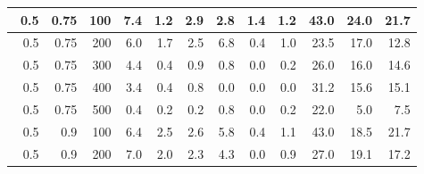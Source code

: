 \begin{longtable}{|r|r|r|r|r|r|r|r|r|r|r|r|}
    \hline \
    0.5                            & 0.75                    & 100                       & 7.4                       & 1.2                       & 2.9                       & 2.8                       & 1.4                       & 1.2                       & 43.0                      & 24.0                      & 21.7                      \\
    \hline \
    0.5                            & 0.75                    & 200                       & 6.0                       & 1.7                       & 2.5                       & 6.8                       & 0.4                       & 1.0                       & 23.5                      & 17.0                      & 12.8                      \\
    \hline \
    0.5                            & 0.75                    & 300                       & 4.4                       & 0.4                       & 0.9                       & 0.8                       & 0.0                       & 0.2                       & 26.0                      & 16.0                       & 14.6                       \\
    \hline \
    0.5                            & 0.75                     & 400                       & 3.4                       & 0.4                       & 0.8                       & 0.0                       & 0.0                       & 0.0                       & 31.2                      & 15.6                      & 15.1                      \\
    \hline \
    0.5                            & 0.75                     & 500                       & 0.4                       & 0.2                       & 0.2                       & 0.8                       & 0.0                       & 0.2                       & 22.0                      & 5.0                      & 7.5                      \\
    \hline \
    0.5                            & 0.9                     & 100                       & 6.4                       & 2.5                       & 2.6                       & 5.8                       & 0.4                       & 1.1                       & 43.0                      & 18.5                       & 21.7                       \\
    \hline \
    0.5                            & 0.9                     & 200                       & 7.0                       & 2.0                       & 2.3                       & 4.3                       & 0.0                       & 0.9                       & 27.0                      & 19.1                       & 17.2                       \\

\end{longtable}

